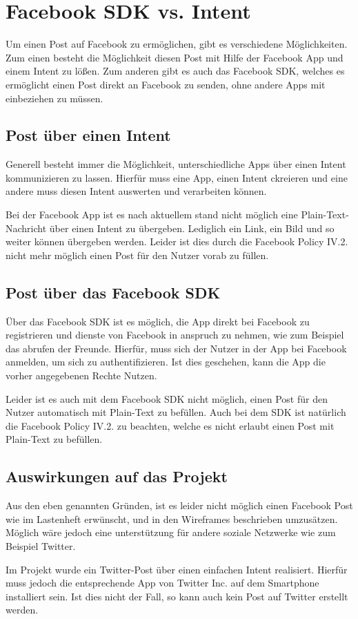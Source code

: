 \section{Facebook SDK vs. Intent} \label{Facebook SDK}
Um einen Post auf Facebook zu erm\"oglichen, gibt es verschiedene M\"oglichkeiten. Zum einen besteht die M\"oglichkeit diesen Post mit Hilfe der Facebook App und einem Intent zu l\"o\ss{}en. Zum anderen gibt es auch das Facebook SDK, welches es erm\"oglicht einen Post direkt an Facebook zu senden, ohne andere Apps mit einbeziehen zu m\"ussen.

\subsection{Post \"uber einen Intent}
Generell besteht immer die M\"oglichkeit, unterschiedliche Apps \"uber einen Intent kommunizieren zu lassen. Hierf\"ur muss eine App, einen Intent ckreieren und eine andere muss diesen Intent auswerten und verarbeiten k\"onnen.

Bei der Facebook App ist es nach aktuellem stand nicht m\"oglich eine Plain-Text-Nachricht \"uber einen Intent zu \"ubergeben. Lediglich ein Link, ein Bild und so weiter k\"onnen \"ubergeben werden. Leider ist dies durch die Facebook Policy IV.2. nicht mehr m\"oglich einen Post f\"ur den Nutzer vorab zu f\"ullen. \cite{fbPolicy2}


\subsection{Post \"uber das Facebook SDK}
\"Uber das Facebook SDK ist es m\"oglich, die App direkt bei Facebook zu registrieren und dienste von Facebook in anspruch zu nehmen, wie zum Beispiel das abrufen der Freunde.
Hierf\"ur, muss sich der Nutzer in der App bei Facebook anmelden, um sich zu authentifizieren. Ist dies geschehen, kann die App die vorher angegebenen Rechte Nutzen.

Leider ist es auch mit dem Facebook SDK nicht m\"oglich, einen Post f\"ur den Nutzer automatisch mit Plain-Text zu bef\"ullen. Auch bei dem SDK ist nat\"urlich die Facebook Policy IV.2. zu beachten, welche es nicht erlaubt einen Post mit Plain-Text zu bef\"ullen. \cite{fbPolicy2} 

\subsection{Auswirkungen auf das Projekt}
Aus den eben genannten Gr\"unden, ist es leider nicht m\"oglich einen Facebook Post wie im Lastenheft erw\"unscht, und in den Wireframes beschrieben umzus\"atzen.
M\"oglich w\"are jedoch eine unterst\"utzung f\"ur andere soziale Netzwerke wie zum Beispiel Twitter.

Im Projekt wurde ein Twitter-Post \"uber einen einfachen Intent realisiert. Hierf\"ur muss jedoch die entsprechende App von Twitter Inc. auf dem Smartphone installiert sein. Ist dies nicht der Fall, so kann auch kein Post auf Twitter erstellt werden.